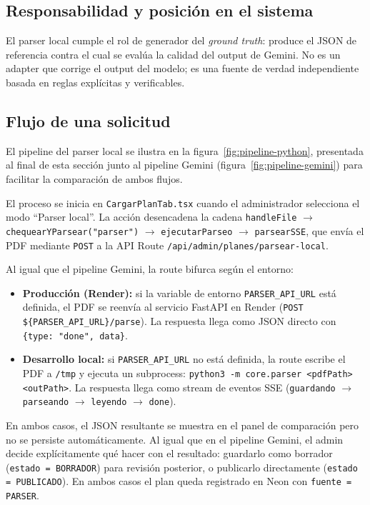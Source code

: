 \documentclass[12pt, a4paper]{report}
\begin{document}
\subsection{Responsabilidad y posición en el sistema}

El parser local cumple el rol de generador del \textit{ground truth}: produce el
JSON de referencia contra el cual se evalúa la calidad del output de Gemini. No
es un adapter que corrige el output del modelo; es una fuente de verdad
independiente basada en reglas explícitas y verificables.

\subsection{Flujo de una solicitud}

El pipeline del parser local se ilustra en la figura~\ref{fig:pipeline-python},
presentada al final de esta sección junto al pipeline Gemini
(figura~\ref{fig:pipeline-gemini}) para facilitar la comparación de ambos flujos.

El proceso se inicia en \texttt{CargarPlanTab.tsx} cuando el administrador
selecciona el modo ``Parser local''. La acción desencadena la cadena
\texttt{handleFile} $\rightarrow$ \texttt{chequearYParsear("parser")} $\rightarrow$
\texttt{ejecutarParseo} $\rightarrow$ \texttt{parsearSSE}, que envía el PDF
mediante \texttt{POST} a la API Route \texttt{/api/admin/planes/parsear-local}.

Al igual que el pipeline Gemini, la route bifurca según el entorno:

\begin{itemize}
  \item \textbf{Producción (Render):} si la variable de entorno
        \texttt{PARSER\_API\_URL} está definida, el PDF se reenvía al servicio
        FastAPI en Render (\texttt{POST \$\{PARSER\_API\_URL\}/parse}). La respuesta
        llega como JSON directo con \texttt{\{type: "done", data\}}.

  \item \textbf{Desarrollo local:} si \texttt{PARSER\_API\_URL} no está definida,
        la route escribe el PDF a \texttt{/tmp} y ejecuta un subprocess:
        \texttt{python3 -m core.parser <pdfPath> <outPath>}. La respuesta llega
        como stream de eventos SSE (\texttt{guardando} $\rightarrow$
        \texttt{parseando} $\rightarrow$ \texttt{leyendo} $\rightarrow$
        \texttt{done}).
\end{itemize}

En ambos casos, el JSON resultante se muestra en el panel de comparación pero
no se persiste automáticamente. Al igual que en el pipeline Gemini, el admin
decide explícitamente qué hacer con el resultado: guardarlo como borrador
(\texttt{estado = BORRADOR}) para revisión posterior, o publicarlo directamente
(\texttt{estado = PUBLICADO}). En ambos casos el plan queda registrado en Neon
con \texttt{fuente = PARSER}.
\end{document}
